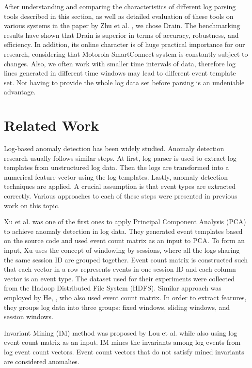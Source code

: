     After understanding and comparing the characteristics of different log parsing tools described in this section, as well as detailed evaluation of these tools on various systems in the paper by Zhu et al. \cite{zhlhxzl2018}, we chose Drain. The benchmarking results have shown that Drain is superior in terms of accuracy, robustness, and efficiency. In addition, its online character is of huge practical importance for our research, considering that Motorola SmartConnect system is constantly subject to changes. Also, we often work with smaller time intervals of data, therefore log lines generated in different time windows may lead to different event template set. Not having to provide the whole log data set before parsing is an undeniable advantage.

\section{Related Work}
Log-based anomaly detection has been widely studied. Anomaly detection research usually follows similar steps. At first, log parser is used to extract log templates from unstructured log data. Then the logs are transformed into a numerical feature vector using the log templates. Lastly, anomaly detection techniques are applied. A crucial assumption is that event types are extracted correctly. Various approaches to each of these steps were presented in previous work on this topic. 


Xu et al. \cite{xu2009} was one of the first ones to apply Principal Component Analysis (PCA) to achieve anomaly detection in log data. They generated event templates based on the source code  and used event count matrix as an input to PCA. To form an input, Xu uses the concept of windowing by sessions, where all the logs sharing the same session ID are grouped together. Event count matrix is constructed such that each vector in a row represents events in one session ID and each column vector is an event type. The dataset used for their experiments were collected from the Hadoop Distributed File System (HDFS).
Similar approach was employed by He, \cite{he2016}, who also used event count matrix. In order to extract features, they groups log data into three groups: fixed windows, sliding windows, and session windows. 

Invariant Mining (IM) method was proposed by Lou et al. \cite{lou2010} while also using log event count matrix as an input. IM mines the invariants among log events from log event count vectors. Event count vectors that do not satisfy mined invariants are considered anomalies. 


